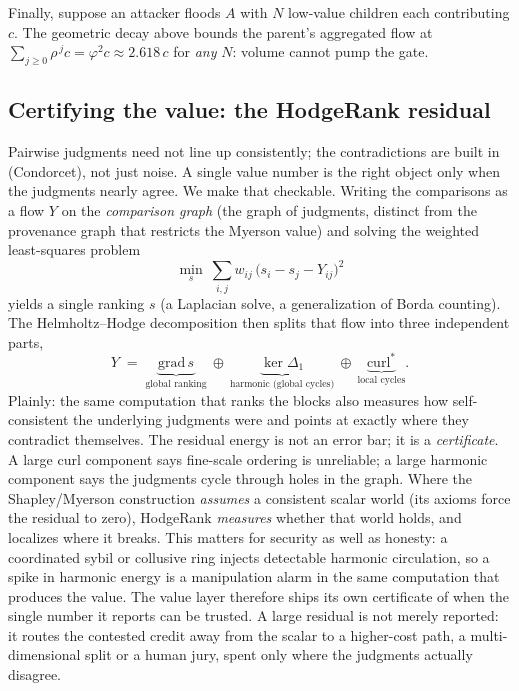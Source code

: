 \documentclass[10pt]{article}
\begin{document}
Finally, suppose an attacker floods $A$ with $N$ low-value children each contributing $c$. The geometric
decay above bounds the parent's aggregated flow at $\sum_{j\ge0}\rho^{\,j} c=\varphi^{2} c\approx
2.618\,c$ for \emph{any} $N$: volume cannot pump the gate.

\subsection{Certifying the value: the HodgeRank residual}

Pairwise judgments need not line up consistently; the contradictions are built in (Condorcet), not just
noise. A single value number is the right object only when the judgments nearly agree. We make that
checkable. Writing the comparisons as a flow $Y$ on the \emph{comparison graph} (the graph of judgments,
distinct from the provenance graph that restricts the Myerson value) and solving the weighted
least-squares problem
\begin{equation}
\min_{s}\ \sum_{i,j} w_{ij}\,\big(s_i - s_j - Y_{ij}\big)^2
\end{equation}
yields a single ranking $s$ (a Laplacian solve, a generalization of Borda counting). The Helmholtz--Hodge
decomposition then splits that flow into three independent parts,
\begin{equation}
Y \;=\; \underbrace{\mathrm{grad}\,s}_{\text{global ranking}}\ \oplus\
\underbrace{\ker \Delta_1}_{\text{harmonic (global cycles)}}\ \oplus\
\underbrace{\mathrm{curl}^{*}}_{\text{local cycles}} .
\end{equation}
Plainly: the same computation that ranks the blocks also measures how self-consistent the underlying
judgments were and points at exactly where they contradict themselves. The residual energy is not an
error bar; it is a \emph{certificate}. A large curl component says
fine-scale ordering is unreliable; a large harmonic component says the judgments cycle through holes
in the graph. Where the Shapley/Myerson construction \emph{assumes} a consistent scalar world (its
axioms force the residual to zero), HodgeRank \emph{measures} whether that world holds, and localizes
where it breaks. This matters for security as well as honesty: a coordinated sybil or collusive ring
injects detectable harmonic circulation, so a spike in harmonic energy is a manipulation alarm in the
same computation that produces the value. The value layer therefore ships its own certificate of when
the single number it reports can be trusted. A large residual is not merely reported: it routes the
contested credit away from the scalar to a higher-cost path, a multi-dimensional split or a human jury,
spent only where the judgments actually disagree.
\end{document}
